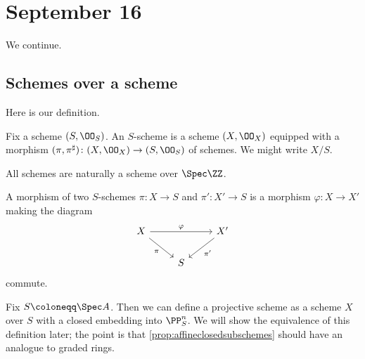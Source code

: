 \documentclass[../notes.tex]{subfiles}
\begin{document}
\section{September 16}

We continue.

\subsection{Schemes over a scheme}
Here is our definition.
\begin{definition}
	Fix a scheme $(S,\OO_S)$. An $S$-scheme is a scheme $(X,\OO_X)$ equipped with a morphism $(\pi,\pi^\sharp)\colon(X,\OO_X)\to(S,\OO_S)$ of schemes. We might write $X/S$.
\end{definition}
\begin{example}
	All schemes are naturally a scheme over $\Spec\ZZ$.
\end{example}
A morphism of two $S$-schemes $\pi\colon X\to S$ and $\pi'\colon X'\to S$ is a morphism $\varphi\colon X\to X'$ making the diagram
\[\begin{tikzcd}
	X && {X'} \\
	& S
	\arrow["\pi"', from=1-1, to=2-2]
	\arrow["{\pi'}", from=1-3, to=2-2]
	\arrow["\varphi", from=1-1, to=1-3]
\end{tikzcd}\]
commute.
\begin{remark}
	Fix $S\coloneqq\Spec A$. Then we can define a projective scheme as a scheme $X$ over $S$ with a closed embedding into $\PP^n_S$. We will show the equivalence of this definition later; the point is that \autoref{prop:affineclosedsubschemes} should have an analogue to graded rings. %
\end{remark}
\end{document}
